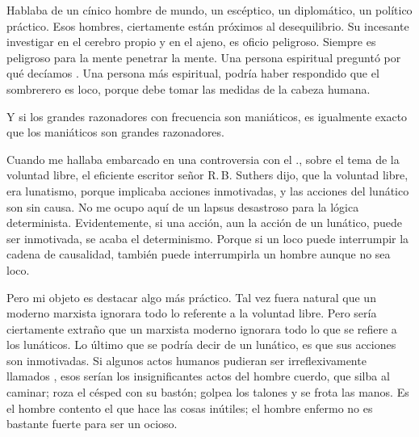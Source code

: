 Hablaba de un cínico hombre de mundo, un escéptico, un diplomático, un político práctico. Esos
hombres, ciertamente están próximos al desequilibrio. Su incesante investigar en el cerebro propio y en el
ajeno, es oficio peligroso. Siempre es peligroso para la mente penetrar la mente. Una persona espiritual
preguntó por qué decíamos . Una persona más espiritual, podría haber
respondido que el sombrerero es loco, porque debe tomar las medidas de la cabeza humana.

Y si los grandes razonadores con frecuencia son maniáticos, es igualmente exacto que los
maniáticos son grandes razonadores.

Cuando me hallaba embarcado en una controversia con el .,
sobre el tema de la voluntad
libre, el eficiente escritor señor R.\,B. Suthers dijo, que la voluntad libre, era lunatismo, porque implicaba
acciones inmotivadas, y las acciones del lunático son sin causa. No me ocupo aquí de un lapsus
desastroso para la lógica determinista. Evidentemente, si una acción, aun la acción de un lunático, puede
ser inmotivada, se acaba el determinismo.
Porque si un loco puede interrumpir la cadena de causalidad, también puede interrumpirla un
hombre aunque no sea loco. 

Pero mi objeto es destacar algo más práctico. Tal vez fuera natural que un
moderno marxista ignorara todo lo referente a la voluntad libre. Pero sería ciertamente extraño que un
marxista moderno ignorara todo lo que se refiere a los lunáticos. Lo último que se podría decir de un
lunático, es que sus acciones son inmotivadas. Si algunos actos humanos pudieran ser irreflexivamente
llamados , esos serían los insignificantes actos del hombre cuerdo, que silba al caminar; roza
el césped con su bastón; golpea los talones y se frota las manos. Es el hombre contento el que hace las
cosas inútiles; el hombre enfermo no es bastante fuerte para ser un ocioso.

